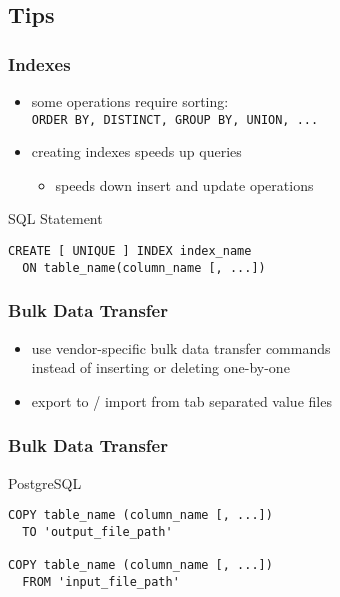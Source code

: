 \documentclass[dvipsnames]{beamer}
\theoremstyle{plain}
\begin{document}
\subsection{Tips}

\begin{frame}[fragile]
  \frametitle{Indexes}

  \begin{itemize}
    \item some operations require sorting:\\
      \lstinline!ORDER BY, DISTINCT, GROUP BY, UNION, ...!

    \pause
    \item creating indexes speeds up queries
    \begin{itemize}
      \item speeds down insert and update operations
    \end{itemize}
  \end{itemize}

  \pause
  \begin{block}{SQL Statement}
    \begin{lstlisting}[language=ExtendedSQL]
CREATE [ UNIQUE ] INDEX index_name
  ON table_name(column_name [, ...])
    \end{lstlisting}
  \end{block}
\end{frame}

\begin{frame}[fragile]
  \frametitle{Bulk Data Transfer}

  \begin{itemize}
    \item use vendor-specific bulk data transfer commands\\
      instead of inserting or deleting one-by-one

    \item export to / import from tab separated value files
  \end{itemize}
\end{frame}

\begin{frame}[fragile]
  \frametitle{Bulk Data Transfer}

  \begin{block}{PostgreSQL}
    \begin{lstlisting}
COPY table_name (column_name [, ...])
  TO 'output_file_path'

COPY table_name (column_name [, ...])
  FROM 'input_file_path'
    \end{lstlisting}
  \end{block}
\end{frame}
\end{document}
